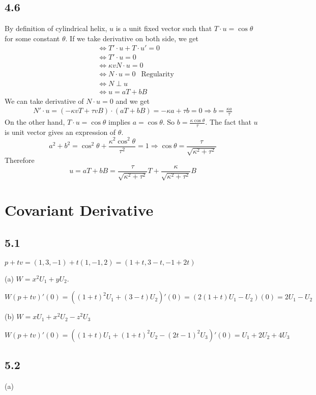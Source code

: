 \documentclass[12pt]{article}
\begin{document}
\subsection*{4.6}
By definition of cylindrical helix, $u$ is a unit fixed vector such that $T\cdot u = \cos \theta$ for some constant $\theta$. If we take derivative on both side, we get
 $$\begin{aligned}
 	&\Leftrightarrow T'\cdot u + T \cdot u' = 0 \\
 	&\Leftrightarrow T'\cdot u = 0 \\
 	&\Leftrightarrow \kappa v N \cdot u = 0 \\
 	&\Leftrightarrow N \cdot u = 0 \ \ \mbox{ Regularity} \\
 	&\Leftrightarrow N \perp u  \\
 	&\Leftrightarrow u = a T + b B
 \end{aligned}$$
We can take derivative of $N \cdot u = 0$ and we get $$
 \begin{aligned}
 	N' \cdot u = (-\kappa vT + \tau v B)\cdot(aT +b B) = -\kappa a +  \tau b = 0 \Rightarrow b = \frac{\kappa a}{\tau}
 \end{aligned}
$$
On the other hand, $T \cdot u = \cos \theta$ implies $a = \cos \theta$. So $b = \frac{\kappa \cos \theta}{\tau}$. The fact that $u$ is unit vector gives an expression of $\theta$. $$ a^2 + b^2 = \cos^2 \theta + \frac{\kappa^2 \cos^2 \theta}{\tau^2} = 1 \Rightarrow \cos \theta = \frac{\tau}{\sqrt{\kappa^2 + \tau^2}}$$ Therefore 
$$u = aT + bB = \frac{\tau}{\sqrt{\kappa^2 + \tau^2}} T + \frac{\kappa}{\sqrt{\kappa^2 + \tau^2}} B$$

\section{Covariant Derivative}
\subsection*{5.1}
$p + tv = (1, 3, -1) + t(1, -1, 2) = (1 + t, 3 -t, -1 + 2t)$

(a) $W = x^2 U_1 + yU_2$.

$W(p+tv)'(0) = ((1+t)^2 U_1 + (3-t)U_2)'(0) = (2(1+t)U_1 - U_2)(0) = 2U_1 - U_2 $ 

(b) $W = xU_1 + x^2U_2 - z^2 U_3$

$W(p+tv)'(0) = ((1+t)U_1 + (1+t)^2U_2 - (2t-1)^2U_3)'(0) = U_1 + 2U_2 + 4U_3$

\subsection*{5.2}
(a) 
\end{document}
